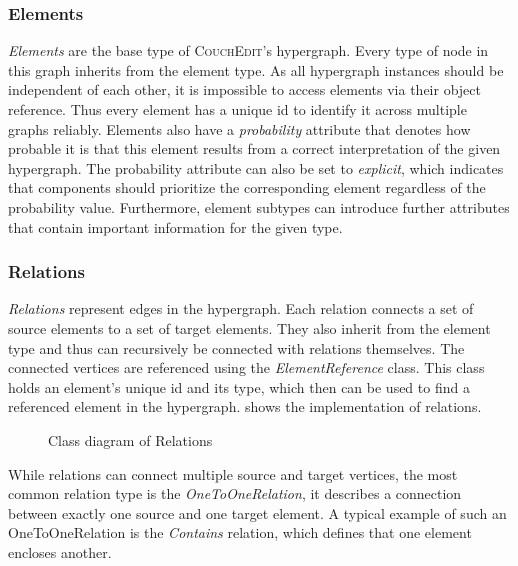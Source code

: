 \subsubsection{Elements}
\emph{Elements} are the base type of \textsc{CouchEdit}'s hypergraph. Every type of node in this graph inherits from the element type. As all hypergraph instances should be independent of each other, it is impossible to access elements via their object reference. Thus every element has a unique id to identify it across multiple graphs reliably. Elements also have a \emph{probability} attribute that denotes how probable it is that this element results from a correct interpretation of the given hypergraph. The probability attribute can also be set to \emph{explicit}, which indicates that components should prioritize the corresponding element regardless of the probability value. Furthermore, element subtypes can introduce further attributes that contain important information for the given type.



\subsubsection{Relations}
\label{sec:relations}
\emph{Relations} represent edges in the hypergraph. Each relation connects a set of source elements to a set of target elements. They also inherit from the element type and thus can recursively be connected with relations themselves. The connected vertices are referenced using the \emph{ElementReference} class. This class holds an element's unique id and its type, which then can be used to find a referenced element in the hypergraph.  shows the implementation of relations. 

\begin{figure}[ht]
  \centering
  
  \caption{Class diagram of Relations}
  \label{fig:relations}
\end{figure}

 While relations can connect multiple source and target vertices, the most common relation type is the \emph{OneToOneRelation}, it describes a connection between exactly one source and one target element. A typical example of such an OneToOneRelation is the \emph{Contains} relation, which defines that one element encloses another.  



